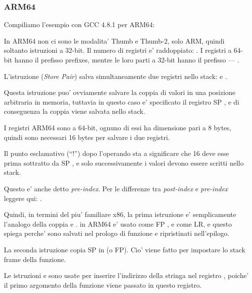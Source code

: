 \subsubsection{ARM64}


Compiliamo l'esempio con GCC 4.8.1 per ARM64:



In ARM64 non ci sono le modalita' Thumb e Thumb-2, solo ARM, quindi soltanto istruzioni a 32-bit.
Il numero di registri e' raddoppiato: .
I registri a 64-bit hanno il prefisso  prefixes, mentre le loro parti a 32-bit hanno il prefisso --- .

L'istruzione  (\emph{Store Pair}) 
salva simultaneamente due registri nello stack:  e .

Questa istruzione puo' ovviamente salvare la coppia di valori in una posizione arbitraria in memoria, tuttavia in questo caso e'
specificato il registro \ac{SP} , e di conseguenza la coppia viene salvata nello stack.

I registri ARM64 sono a 64-bit, ognuno di essi ha dimensione pari a 8 bytes, quindi sono necessari 16 bytes per salvare i due registri.

Il punto esclamativo (``!'') dopo l'operando sta a significare che 16 deve esse prima sottratto da \ac{SP} , e solo successivamente
i valori devono essere scritti nello stack.

Questo e' anche detto \emph{pre-index}.
Per le differenze tra \emph{post-index} e \emph{pre-index} 
leggere qui: .

Quindi, in termini del piu' familiare x86, la prima istruzione e' semplicamente l'analogo della coppia
 e .
 in ARM64 e' usato come \ac{FP} , e  
come \ac{LR}, e questo spiega perche' sono salvati nel prologo di funzione e ripristinati nell'epilogo.

La seconda istruzione copia \ac{SP} in  (o \ac{FP}).
Cio' viene fatto per impostare lo stack frame della funzione.

\label{pointers_ADRP_and_ADD}
Le istruzioni  e \ADD sono usate per inserire
l'indirizzo della stringa  nel registro  , 
poiche' il primo argomento della funzione viene passato in questo registro.

